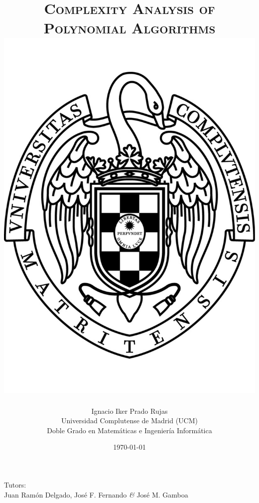\documentclass[11pt, a4paper, english, twoside, notitlepage, openright]{report}
\begin{document}
\begin{titlepage}

\title{\huge{\textsc{Complexity Analysis of\\
Polynomial Algorithms}} \\
\protect\includegraphics[scale=0.2]{ucm.pdf}}
\author{Ignacio Iker Prado Rujas \\
Universidad Complutense de Madrid (UCM) \\
Doble Grado en Matem\'aticas e Ingenier\'ia Inform\'atica}
\date{\today}
\maketitle
\thispagestyle{empty}

\begin{center}
Tutors: \\
Juan Ram\'on Delgado, Jos\'e F. Fernando \textit{\&} Jos\'e M. Gamboa \\
\
\end{center}


\end{titlepage}
\end{document}
